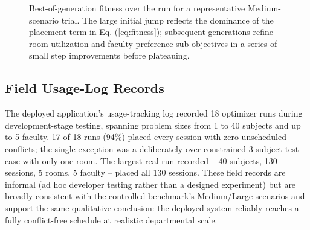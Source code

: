 \documentclass[conference]{IEEEtran}
\begin{document}
\begin{figure}[t]
\centering
{}
\caption{Best-of-generation fitness over the run for a representative Medium-scenario trial. The large initial jump reflects the dominance of the placement term in Eq. (\ref{eq:fitness}); subsequent generations refine room-utilization and faculty-preference sub-objectives in a series of small step improvements before plateauing.}
\label{fig:convergence}
\end{figure}

\subsection{Field Usage-Log Records}
The deployed application's usage-tracking log recorded 18 optimizer runs during development-stage testing, spanning problem sizes from 1 to 40 subjects and up to 5 faculty. 17 of 18 runs (94\%) placed every session with zero unscheduled conflicts; the single exception was a deliberately over-constrained 3-subject test case with only one room. The largest real run recorded -- 40 subjects, 130 sessions, 5 rooms, 5 faculty -- placed all 130 sessions. These field records are informal (ad hoc developer testing rather than a designed experiment) but are broadly consistent with the controlled benchmark's Medium/Large scenarios and support the same qualitative conclusion: the deployed system reliably reaches a fully conflict-free schedule at realistic departmental scale.
\end{document}
